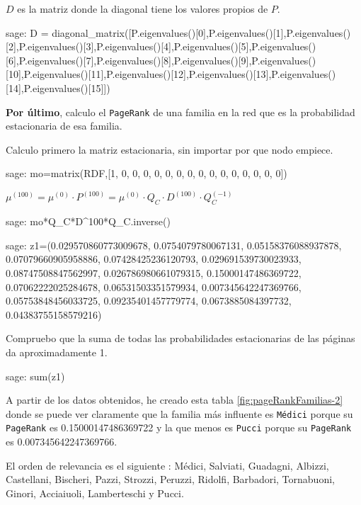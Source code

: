 \par $D$ es la matriz donde la diagonal tiene los valores propios de $P$.
\begin{sagecommandline}
    sage: D = diagonal_matrix([P.eigenvalues()[0],P.eigenvalues()[1],P.eigenvalues()[2],P.eigenvalues()[3],P.eigenvalues()[4],P.eigenvalues()[5],P.eigenvalues()[6],P.eigenvalues()[7],P.eigenvalues()[8],P.eigenvalues()[9],P.eigenvalues()[10],P.eigenvalues()[11],P.eigenvalues()[12],P.eigenvalues()[13],P.eigenvalues()[14],P.eigenvalues()[15]])
\end{sagecommandline}

\par \textbf{Por último}, calculo el \texttt{PageRank} de una familia en la red que es la probabilidad estacionaria de esa familia.
\par Calculo primero la matriz estacionaria, sin importar por que nodo empiece.
\begin{sagecommandline}
    sage: mo=matrix(RDF,[1, 0, 0, 0, 0, 0, 0, 0, 0, 0, 0, 0, 0, 0, 0, 0])
\end{sagecommandline}
\par $\mu^{(100)} = \mu^{(0)} \cdot P^{(100)} = \mu^{(0)} \cdot Q_C \cdot D^{(100)} \cdot Q_C^{(-1)}$
\begin{sagecommandline}
    sage: mo*Q_C*D^100*Q_C.inverse()
\end{sagecommandline}

\begin{sagecommandline}
    sage: z1=(0.029570860773009678, 0.0754079780067131, 0.05158376088937878, 0.07079660905958886, 0.07428425236120793, 0.029691539730023933, 0.08747508847562997, 0.026786980661079315, 0.15000147486369722, 0.07062222025284678, 0.06531503351579934, 0.007345642247369766, 0.05753848456033725, 0.09235401457779774, 0.0673885084397732, 0.04383755158579216)
\end{sagecommandline}

\par Compruebo que la suma de todas las probabilidades estacionarias de las páginas da aproximadamente 1.
\begin{sagecommandline}
    sage: sum(z1)
\end{sagecommandline}

\par A partir de los datos obtenidos, he creado esta tabla \ref{fig:pageRankFamilias-2} donde se puede ver claramente que 
la familia más influente es \texttt{Médici} porque su \texttt{PageRank} es 0.15000147486369722 y la que menos es 
\texttt{Pucci} porque su \texttt{PageRank} es 0.007345642247369766.
\par El orden de relevancia es el siguiente : Médici, Salviati, Guadagni, Albizzi, Castellani, Bischeri, Pazzi, Strozzi, Peruzzi,
Ridolfi, Barbadori, Tornabuoni, Ginori, Acciaiuoli, Lamberteschi y Pucci.

